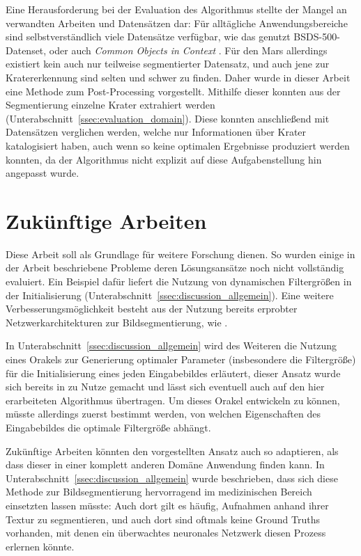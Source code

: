 Eine Herausforderung bei der Evaluation des Algorithmus stellte der Mangel an verwandten Arbeiten und Datensätzen dar: Für alltägliche Anwendungsbereiche sind selbstverständlich viele Datensätze verfügbar, wie das genutzt BSDS-500-Datenset, oder auch \textit{Common Objects in Context} \cite{lin_14}. Für den Mars allerdings existiert kein auch nur teilweise segmentierter Datensatz, und auch jene zur Kratererkennung sind selten und schwer zu finden. Daher wurde in dieser Arbeit eine Methode zum Post-Processing vorgestellt. Mithilfe dieser konnten aus der Segmentierung einzelne Krater extrahiert werden (\vgl Unterabschnitt~\ref{ssec:evaluation_domain}). Diese konnten anschließend mit Datensätzen verglichen werden, welche nur Informationen über Krater katalogisiert haben, auch wenn so keine optimalen Ergebnisse produziert werden konnten, da der Algorithmus nicht explizit auf diese Aufgabenstellung hin angepasst wurde.

\section{Zukünftige Arbeiten}

Diese Arbeit soll als Grundlage für weitere Forschung dienen. So wurden einige in der Arbeit beschriebene Probleme \bzw deren Lösungsansätze noch nicht vollständig evaluiert. Ein Beispiel dafür liefert die Nutzung von dynamischen Filtergrößen in der Initialisierung (\vgl Unterabschnitt~\ref{ssec:discussion_allgemein}). Eine weitere Verbesserungsmöglichkeit besteht aus der Nutzung bereits erprobter Netzwerkarchitekturen zur Bildsegmentierung, wie \bspw \cite{ronneberger_15}.

In Unterabschnitt~\ref{ssec:discussion_allgemein} wird des Weiteren die Nutzung eines Orakels zur Generierung optimaler Parameter (insbesondere die Filtergröße) für die Initialisierung eines jeden Eingabebildes erläutert, dieser Ansatz wurde sich bereits in \cite{arbelaez_10} zu Nutze gemacht und lässt sich eventuell auch auf den hier erarbeiteten Algorithmus übertragen. Um dieses Orakel entwickeln zu können, müsste allerdings zuerst bestimmt werden, von welchen Eigenschaften des Eingabebildes die optimale Filtergröße abhängt.

Zukünftige Arbeiten könnten den vorgestellten Ansatz auch so adaptieren, als dass dieser in einer komplett anderen Domäne Anwendung finden kann. In Unterabschnitt~\ref{ssec:discussion_allgemein} wurde beschrieben, dass sich diese Methode zur Bildsegmentierung hervorragend im medizinischen Bereich einsetzten lassen müsste: Auch dort gilt es häufig, Aufnahmen anhand ihrer Textur zu segmentieren, und auch dort sind oftmals keine Ground Truths vorhanden, mit denen ein überwachtes neuronales Netzwerk diesen Prozess erlernen könnte.

